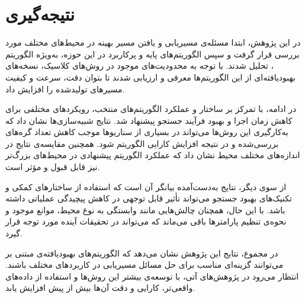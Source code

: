 \chapter{نتیجه‌گیری}
\label{ch5}

در این پژوهش، ابتدا مسئله‌ی مسیریابی و یافتن مسیر بهینه در محیط‌های مختلف مورد بررسی قرار گرفت و سپس الگوریتم‌های پایه و پرکاربرد در این حوزه، به‌ویژه الگوریتم ، تحلیل شدند. با توجه به محدودیت‌های موجود در روش‌های کلاسیک، نسخه‌های بهبود‌یافته‌ای از این الگوریتم‌ها معرفی و ارزیابی شدند تا بتوان دقت، سرعت و کیفیت مسیرهای تولیدشده را افزایش داد.

در ادامه، با تمرکز بر ساختار و عملکرد الگوریتم‌های منتخب، رویکردهای مختلفی برای کاهش زمان اجرا و بهبود فرآیند جستجو پیشنهاد شد. نتایج شبیه‌سازی‌ها نشان داد که به‌کارگیری این روش‌ها می‌تواند در بسیاری از سناریوها موجب کاهش تعداد گره‌های بررسی‌شده و در نتیجه افزایش کارایی الگوریتم شود. همچنین مقایسه‌ی نتایج در اندازه‌های مختلف محیط نشان داد که عملکرد الگوریتم پیشنهادی در محیط‌های بزرگ‌تر نیز قابل قبول و مؤثر است.

از سوی دیگر، نتایج به‌دست‌آمده بیانگر آن است که استفاده از ساختارهای کمکی و تکنیک‌های بهبود جستجو می‌تواند تأثیر قابل توجهی در کاهش پیچیدگی عملیاتی داشته باشد. با این حال، همچنان چالش‌هایی مانند وابستگی به نوع محیط، موانع موجود و نحوه‌ی تنظیم پارامترها باقی می‌ماند که می‌تواند در تحقیقات آینده مورد توجه قرار گیرد.

در مجموع، نتایج این پژوهش نشان می‌دهد که الگوریتم‌های بهبود‌یافته‌ی مبتنی بر  می‌توانند گزینه‌ای مناسب برای حل مسائل مسیریابی در کاربردهای مختلف باشند. انتظار می‌رود در پژوهش‌های آتی، با توسعه‌ی بیشتر این روش‌ها و استفاده از داده‌های واقعی‌تر، کارایی و دقت آن‌ها بیش از پیش افزایش یابد.

